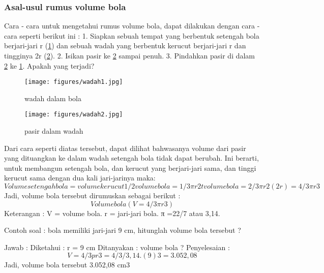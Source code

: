 \subsubsection{Asal-usul rumus volume bola}
Cara - cara untuk mengetahui rumus volume bola, dapat dilakukan dengan cara - cara seperti berikut ini : 
1. Siapkan sebuah tempat yang berbentuk setengah bola berjari-jari r (\ref{wadah1}) dan sebuah wadah yang berbentuk kerucut berjari-jari r dan tingginya 2r (\ref{wadah2}).
2. Isikan pasir ke \ref{wadah2} sampai penuh.
3. Pindahkan pasir di dalam \ref{wadah2} ke \ref{wadah1}. Apakah yang terjadi?
\begin{figure}[ht]
    \centerline{\texttt{[image: figures/wadah1.jpg]}}
    \caption{wadah dalam bola}
    \label{wadah1}
    \end{figure}
\begin{figure}[ht]
    \centerline{\texttt{[image: figures/wadah2.jpg]}}
    \caption{pasir dalam wadah}
    \label{wadah2}
    \end{figure}

Dari cara seperti diatas tersebut, dapat dilihat bahwasanya volume dari pasir yang dituangkan ke dalam wadah setengah bola tidak dapat berubah. Ini berarti, untuk membangun setengah bola, dan kerucut yang berjari-jari sama, dan tinggi kerucut sama dengan dua kali jari-jarinya maka:
\begin{equation}
Volume setengah bola = volume kerucut
1/2 volume bola = 1/3 πr2t
volume bola = 2/3πr2(2r)
                         = 4/3πr3
\end{equation}
Jadi, volume bola tersebut dirumuskan sebagai berikut :
\begin{equation}
Volume bola ( V = 4/3πr3 )
\end{equation}
Keterangan :
V = volume bola.
r = jari-jari bola.
π =22/7 atau 3,14.

Contoh soal :
bola memiliki jari-jari 9 cm, hitunglah volume bola tersebut ?

Jawab :
Diketahui : r = 9 cm
Ditanyakan : volume bola ?
Penyelesaian :
\begin{equation}
V   = 4/3pr3
    = 4/3/ 3 , 14 . (9)3
    = 3.052,08
\end{equation}
Jadi, volume bola tersebut 3.052,08 cm3
